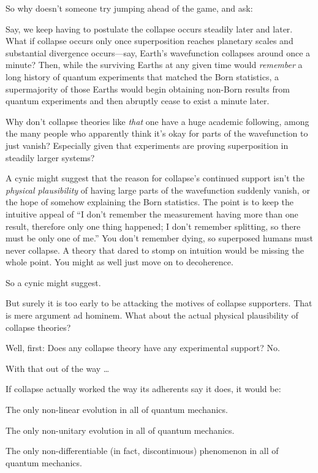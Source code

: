 {
 So why doesn't someone try jumping ahead of the
game, and ask:}

{
 Say, we keep having to postulate the collapse occurs steadily
later and later. What if collapse occurs only once superposition
reaches planetary scales and substantial divergence occurs---say,
Earth's wavefunction collapses around once a minute?
Then, while the surviving Earths at any given time would
\textit{remember} a long history of quantum experiments that matched
the Born statistics, a supermajority of those Earths would begin
obtaining non-Born results from quantum experiments and then abruptly
cease to exist a minute later.}

{
 Why don't collapse theories like \textit{that} one
have a huge academic following, among the many people who apparently
think it's okay for parts of the wavefunction to just
vanish? Especially given that experiments are proving superposition in
steadily larger systems?}

{
 A cynic might suggest that the reason for
collapse's continued support isn't the
\textit{physical plausibility} of having large parts of the
wavefunction suddenly vanish, or the hope of somehow explaining the
Born statistics. The point is to keep the intuitive appeal of
``I don't remember the measurement
having more than one result, therefore only one thing happened; I
don't remember splitting, so there must be only one of
me.'' You don't remember dying, so
superposed humans must never collapse. A theory that dared to stomp on
intuition would be missing the whole point. You might as well just move
on to decoherence.}

{
 So a cynic might suggest.}

{
 But surely it is too early to be attacking the motives of collapse
supporters. That is mere argument ad hominem. What about the actual
physical plausibility of collapse theories?}

{
 Well, first: Does any collapse theory have any experimental
support? No.}

{
 With that out of the way \ldots}

{
 If collapse actually worked the way its adherents say it does, it
would be:}

{
 The only non-linear evolution in all of quantum mechanics.}

{
 The only non-unitary evolution in all of quantum mechanics.}

{
 The only non-differentiable (in fact, discontinuous) phenomenon in
all of quantum mechanics.}

